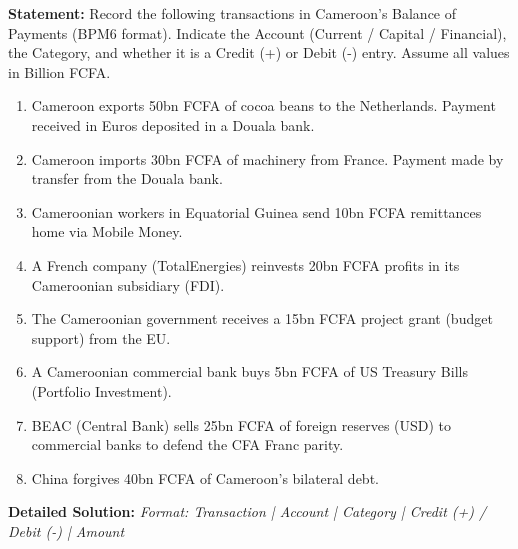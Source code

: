 \documentclass[11pt]{article}
\begin{document}
\begin{exoresolu}
\textbf{Statement:} Record the following transactions in Cameroon's Balance of Payments (BPM6 format). Indicate the Account (Current / Capital / Financial), the Category, and whether it is a Credit (+) or Debit (-) entry. Assume all values in Billion FCFA.
\begin{enumerate}
    \item Cameroon exports 50bn FCFA of cocoa beans to the Netherlands. Payment received in Euros deposited in a Douala bank.
    \item Cameroon imports 30bn FCFA of machinery from France. Payment made by transfer from the Douala bank.
    \item Cameroonian workers in Equatorial Guinea send 10bn FCFA remittances home via Mobile Money.
    \item A French company (TotalEnergies) reinvests 20bn FCFA profits in its Cameroonian subsidiary (FDI).
    \item The Cameroonian government receives a 15bn FCFA project grant (budget support) from the EU.
    \item A Cameroonian commercial bank buys 5bn FCFA of US Treasury Bills (Portfolio Investment).
    \item BEAC (Central Bank) sells 25bn FCFA of foreign reserves (USD) to commercial banks to defend the CFA Franc parity.
    \item China forgives 40bn FCFA of Cameroon's bilateral debt.
\end{enumerate}

\tcblower
\textbf{Detailed Solution:}
\textit{Format: Transaction | Account | Category | Credit (+) / Debit (-) | Amount}


\end{exoresolu}
\end{document}
